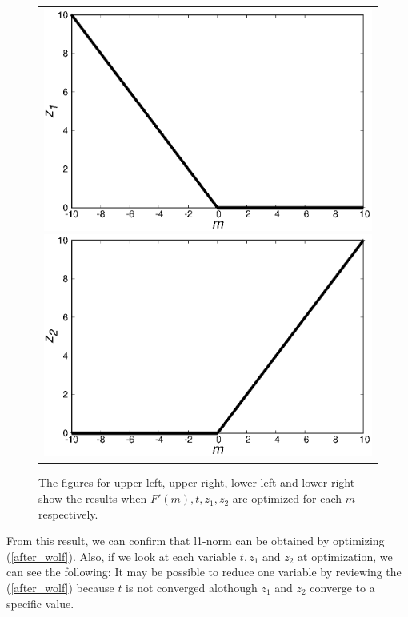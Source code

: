 \documentclass[fp,twocolumn]{jpsj3}
\begin{document}
\begin{figure}[htbp]
\begin{center}
\begin{tabular}{c}
\begin{minipage}{0.50\hsize}
        \includegraphics[keepaspectratio,scale=0.33]{minimum_z1.eps}
      \end{minipage}
      \begin{minipage}{0.50\hsize}
        \centering
        \includegraphics[keepaspectratio,scale=0.33]{minimum_z2.eps}
      \end{minipage}
    \end{tabular}
    \caption{The figures for upper left, upper right, lower left and lower right show the results when $F'(m), t, z_{1}, z_{2}$ are optimized for each $m$ respectively.}
    \label{fig:minimum1}
  \end{center}
\end{figure}
From this result, we can confirm that l1-norm can be obtained by optimizing (\ref{after_wolf}). Also, if we look at each variable $t, z_{1}$ and $z_{2}$ at optimization, we can see the following: It may be possible to reduce one variable by reviewing the (\ref{after_wolf}) because $t$ is not converged alothough $z_{1}$ and $z_{2}$ converge to a specific value.
\end{document}
